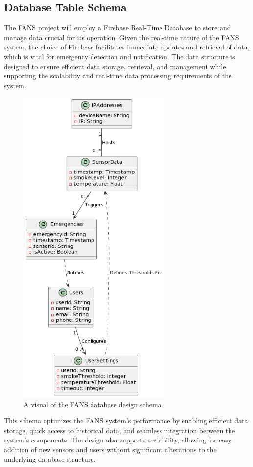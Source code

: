 \subsection{Database Table Schema}

The FANS project will employ a Firebase Real-Time Database to store and manage data crucial for its operation. Given
the real-time nature of the FANS system, the choice of Firebase facilitates immediate updates and retrieval of data,
which is vital for emergency detection and notification. The data structure is designed to ensure efficient data
storage, retrieval, and management while supporting the scalability and real-time data processing requirements of the
system.

\begin{figure}[H]
    \centering
    \includegraphics[width=3in]{../assets/class/DatabaseTableDesign.png}
    \caption{A visual of the FANS database design schema.}
\end{figure}

This schema optimizes the FANS system's performance by enabling efficient data storage, quick access to historical
data, and seamless integration between the system's components. The design also supports scalability, allowing for easy
addition of new sensors and users without significant alterations to the underlying database structure.
